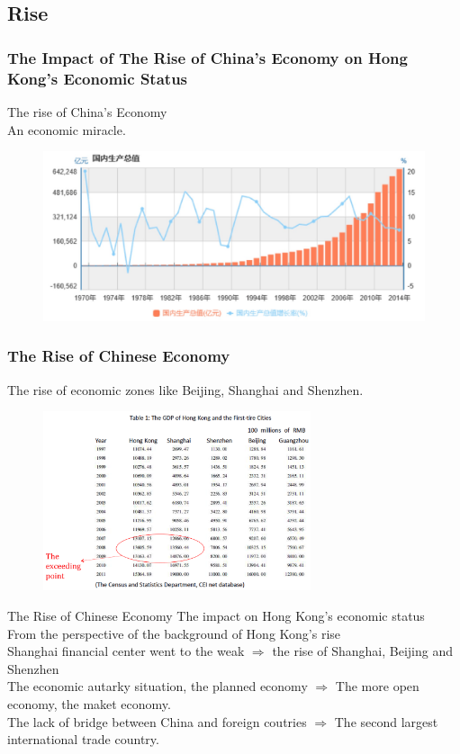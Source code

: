 \documentclass[slidestop,uncompress,mathsans, 12pt]{beamer}
\begin{document}
\subsection{Rise}
\begin{frame}
\frametitle{The Impact of The Rise of China's Economy on Hong Kong's Economic Status}
The rise of China's Economy\\
An economic miracle.\\
\bigskip
\begin{figure}[h!]
\centering
\includegraphics[width=1\textwidth]{hk8.jpg}
\label{threadsVsSync}
\end{figure}
\end{frame}



\begin{frame}
\frametitle{The Rise of Chinese Economy}
The rise of economic zones like Beijing, Shanghai and    Shenzhen. \\
\begin{figure}[h!]
\centering
\includegraphics[width=0.7\textwidth]{hk8.png}
\label{threadsVsSync}
\end{figure}
\end{frame}
\begin{frame}{The Rise of Chinese Economy}
The impact on Hong Kong's economic status\\
\bigskip
From the perspective of the background of Hong Kong's rise\\
\bigskip
\bigskip
Shanghai financial center went to the weak
$\Longrightarrow$ the rise of Shanghai, Beijing and Shenzhen\\
\bigskip
\bigskip
The economic autarky situation, the planned economy
$\Longrightarrow$ The more open economy, the maket economy.\\
\bigskip
\bigskip
The lack of bridge between China and foreign coutries
$\Longrightarrow$ The second largest international trade country.\\
 



\end{frame}
\end{document}
